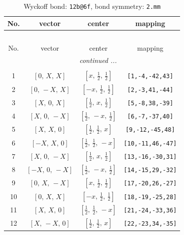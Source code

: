 \documentclass[fleqn,8pt]{jsarticle}
\begin{document}
\renewcommand{\arraystretch}{1.2}
\begin{longtable}{cccc}
\caption{Wyckoff bond: {\tt 12b@6f}, bond symmetry: {\tt 2.mm}}
 \\
 \hline \hline
No. & vector & center & mapping \\ \hline \endfirsthead

\multicolumn{3}{l}{\tablename\ \thetable{}} \\
 \hline \hline
No. & vector & center & mapping \\ \hline \endhead

 \hline \hline
\multicolumn{3}{r}{\footnotesize\it continued ...} \\ \endfoot

 \hline \hline
\multicolumn{3}{r}{} \\ \endlastfoot

1 & $\left[ 0,\, X,\, X \right]$ & $\left[ x,\, \frac{1}{2},\, \frac{1}{2} \right]$ & {\tt [1,-4,-42,43]} \\ \hline
2 & $\left[ 0,\, - X,\, X \right]$ & $\left[ - x,\, \frac{1}{2},\, \frac{1}{2} \right]$ & {\tt [2,-3,41,-44]} \\ \hline
3 & $\left[ X,\, 0,\, X \right]$ & $\left[ \frac{1}{2},\, x,\, \frac{1}{2} \right]$ & {\tt [5,-8,38,-39]} \\ \hline
4 & $\left[ X,\, 0,\, - X \right]$ & $\left[ \frac{1}{2},\, - x,\, \frac{1}{2} \right]$ & {\tt [6,-7,-37,40]} \\ \hline
5 & $\left[ X,\, X,\, 0 \right]$ & $\left[ \frac{1}{2},\, \frac{1}{2},\, x \right]$ & {\tt [9,-12,-45,48]} \\ \hline
6 & $\left[ - X,\, X,\, 0 \right]$ & $\left[ \frac{1}{2},\, \frac{1}{2},\, - x \right]$ & {\tt [10,-11,46,-47]} \\ \hline
7 & $\left[ X,\, 0,\, - X \right]$ & $\left[ \frac{1}{2},\, x,\, \frac{1}{2} \right]$ & {\tt [13,-16,-30,31]} \\ \hline
8 & $\left[ - X,\, 0,\, - X \right]$ & $\left[ \frac{1}{2},\, - x,\, \frac{1}{2} \right]$ & {\tt [14,-15,29,-32]} \\ \hline
9 & $\left[ 0,\, X,\, - X \right]$ & $\left[ x,\, \frac{1}{2},\, \frac{1}{2} \right]$ & {\tt [17,-20,26,-27]} \\ \hline
10 & $\left[ 0,\, X,\, X \right]$ & $\left[ - x,\, \frac{1}{2},\, \frac{1}{2} \right]$ & {\tt [18,-19,-25,28]} \\ \hline
11 & $\left[ X,\, X,\, 0 \right]$ & $\left[ \frac{1}{2},\, \frac{1}{2},\, - x \right]$ & {\tt [21,-24,-33,36]} \\ \hline
12 & $\left[ X,\, - X,\, 0 \right]$ & $\left[ \frac{1}{2},\, \frac{1}{2},\, x \right]$ & {\tt [22,-23,34,-35]} \\
\end{longtable}
\end{document}

